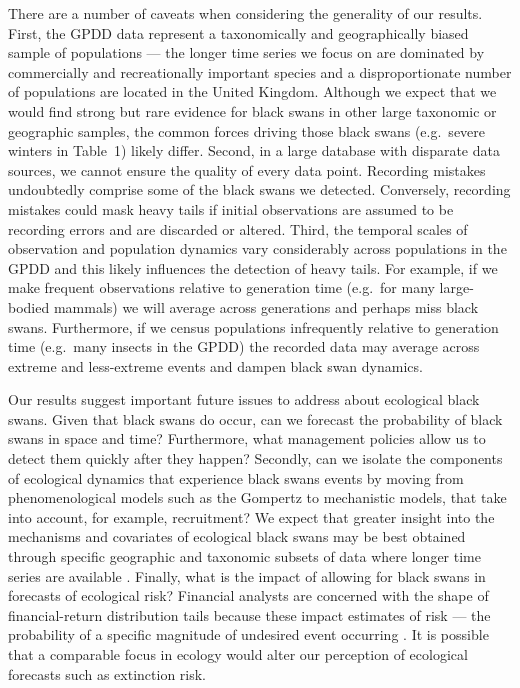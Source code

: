 There are a number of caveats when considering the generality of our results.
First, the GPDD data represent a taxonomically and geographically biased sample
of populations --- the longer time series we focus on are dominated by
commercially and recreationally important species and a disproportionate number
of populations are located in the United Kingdom. Although we expect that we
would find strong but rare evidence for black swans in other large taxonomic or
geographic samples, the common forces driving those black swans (e.g.~severe
winters in Table~1) likely differ. Second, in a large database with disparate
data sources, we cannot ensure the quality of every data point. Recording
mistakes undoubtedly comprise some of the black swans we detected. Conversely,
recording mistakes could mask heavy tails if initial observations are assumed
to be recording errors and are discarded or altered. Third, the temporal scales
of observation and population dynamics vary considerably across populations in
the GPDD and this likely influences the detection of heavy tails. For example,
if we make frequent observations relative to generation time (e.g.~for many
large-bodied mammals) we will average across generations and perhaps miss
black swans. Furthermore, if we census populations infrequently relative to
generation time (e.g.~many insects in the GPDD) the recorded data may average
across extreme and less-extreme events and dampen black swan dynamics.

Our results suggest important future issues to address about ecological black
swans. Given that black swans do occur, can we forecast the probability of
black swans in space and time? Furthermore, what management policies allow us
to detect them quickly after they happen? Secondly, can we isolate the
components of ecological dynamics that experience black swans events by moving
from phenomenological models such as the Gompertz to mechanistic models, that
take into account, for example, recruitment? We expect that greater insight
into the mechanisms and covariates of ecological black swans may be best
obtained through specific geographic and taxonomic subsets of data where longer
time series are available \citep[e.g.][]{segura2013}. Finally, what is the
impact of allowing for black swans in forecasts of ecological risk? Financial
analysts are concerned with the shape of financial-return distribution tails
because these impact estimates of risk --- the probability of a specific
magnitude of undesired event occurring \citep{rachev2008}. It is possible that
a comparable focus in ecology would alter our perception of ecological
forecasts such as extinction risk.

